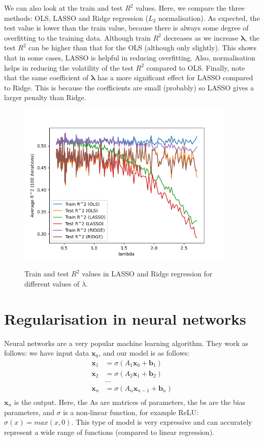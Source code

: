 \documentclass[11pt,a4paper]{article}
\begin{document}
We can also look at the train and test $R^2$ values. Here, we compare the three methods: OLS, LASSO and Ridge regression ($L_2$ normalisation). As expected, the test value is lower than the train value, because there is always some degree of overfitting to the training data. Although train $R^2$ decreases as we increase $\mathbf{\lambda}$, the test $R^2$ can be higher than that for the OLS (although only slightly). This shows that in some cases, LASSO is helpful in reducing overfitting. Also, normalisation helps in reducing the volatility of the test $R^2$ compared to OLS. Finally, note that the same coefficient of $\mathbf{\lambda}$ has a more significant effect for LASSO compared to Ridge. This is because the coefficients are small (probably) so LASSO gives a larger penalty than Ridge. \\

\begin{figure}[htbp]\centering\label{fig2}
  \includegraphics[height=78mm,angle=0]{fig2.png}
  \caption{Train and test $R^2$ values in LASSO and Ridge regression for different values of $\lambda$.}
\end{figure}

\section{Regularisation in neural networks}
Neural networks are a very popular machine learning algorithm. They work as follows: we have input data $\mathbf{x}_0$, and our model is as follows:
\begin{align*}
\mathbf{x}_1 &= \sigma(A_1 \mathbf{x}_0 + \mathbf{b}_1) \\
\mathbf{x}_2 &= \sigma(A_2 \mathbf{x}_1 + \mathbf{b}_2) \\
&... \\
\mathbf{x}_n &= \sigma(A_n \mathbf{x}_{n-1} + \mathbf{b}_n) \\
\end{align*}
$\mathbf{x}_n$ is the output. Here, the As are matrices of parameters, the bs are the bias parameters, and $\sigma$ is a non-linear function, for example ReLU: $\sigma(x) = max(x,0)$. This type of model is very expressive and can accurately represent a wide range of functions (compared to linear regression). \\
\end{document}
